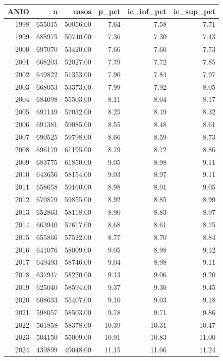 \begin{tabular}{rrrrrr}
\toprule
ANIO & n & casos & p\_pct & ic\_inf\_pct & ic\_sup\_pct \\
\midrule
1998 & 655015 & 50056.00 & 7.64 & 7.58 & 7.71 \\
1999 & 688975 & 50740.00 & 7.36 & 7.30 & 7.43 \\
2000 & 697070 & 53420.00 & 7.66 & 7.60 & 7.73 \\
2001 & 668203 & 52027.00 & 7.79 & 7.72 & 7.85 \\
2002 & 649822 & 51353.00 & 7.90 & 7.84 & 7.97 \\
2003 & 668053 & 53373.00 & 7.99 & 7.92 & 8.05 \\
2004 & 684698 & 55503.00 & 8.11 & 8.04 & 8.17 \\
2005 & 691149 & 57032.00 & 8.25 & 8.19 & 8.32 \\
2006 & 691381 & 59085.00 & 8.55 & 8.48 & 8.61 \\
2007 & 690525 & 59798.00 & 8.66 & 8.59 & 8.73 \\
2008 & 696179 & 61195.00 & 8.79 & 8.72 & 8.86 \\
2009 & 683775 & 61850.00 & 9.05 & 8.98 & 9.11 \\
2010 & 643656 & 58154.00 & 9.03 & 8.97 & 9.11 \\
2011 & 658658 & 59160.00 & 8.98 & 8.91 & 9.05 \\
2012 & 670879 & 59855.00 & 8.92 & 8.85 & 8.99 \\
2013 & 652863 & 58118.00 & 8.90 & 8.83 & 8.97 \\
2014 & 663940 & 57617.00 & 8.68 & 8.61 & 8.75 \\
2015 & 655866 & 57522.00 & 8.77 & 8.70 & 8.84 \\
2016 & 641076 & 58009.00 & 9.05 & 8.98 & 9.12 \\
2017 & 649493 & 58746.00 & 9.04 & 8.98 & 9.11 \\
2018 & 637947 & 58220.00 & 9.13 & 9.06 & 9.20 \\
2019 & 625040 & 58594.00 & 9.37 & 9.30 & 9.45 \\
2020 & 608633 & 55407.00 & 9.10 & 9.03 & 9.18 \\
2021 & 598057 & 58503.00 & 9.78 & 9.71 & 9.86 \\
2022 & 561858 & 58378.00 & 10.39 & 10.31 & 10.47 \\
2023 & 504150 & 55009.00 & 10.91 & 10.83 & 11.00 \\
2024 & 439899 & 49048.00 & 11.15 & 11.06 & 11.24 \\
\bottomrule
\end{tabular}

